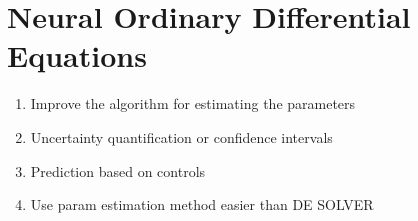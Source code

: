 
\section{Neural Ordinary Differential Equations}
\label{sec:neural-odes}

\begin{enumerate}
	\item Improve the algorithm for estimating the parameters
	\item Uncertainty quantification or confidence intervals
	\item Prediction based on controls
    \item Use param estimation method easier than DE SOLVER
\end{enumerate}